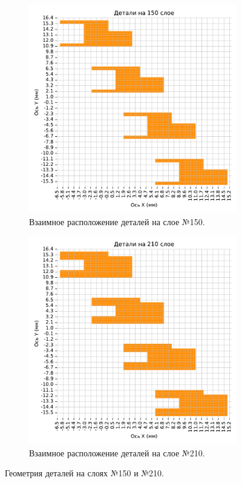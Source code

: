 \documentclass{article}
\begin{document}
    \begin{figure}[H]
        \center
        \begin{subfigure}{.47\textwidth}
            \centering
            \includegraphics[scale=.4]{150_parts.pdf}
            \caption{Взаимное расположение деталей на слое №150.}
        \end{subfigure}
        \hfill
        \begin{subfigure}{.47\textwidth}
            \centering
            \includegraphics[scale=.4]{210_parts.pdf}
            \caption{Взаимное расположение деталей на слое №210.}
        \end{subfigure}
        \caption{Геометрия деталей на слоях №150 и №210.}\label{parts_geom}
    \end{figure}
\end{document}
